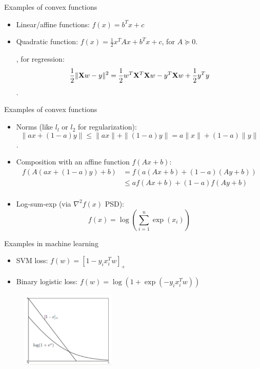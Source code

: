\documentclass[notes]{beamer}
\begin{document}
\begin{frame}
	{Examples of convex functions}
	\begin{itemize}
		\item Linear/affine functions: $f(x)=b^Tx +c$
		\item Quadratic function: $f(x)=\frac{1}{2}x^TAx+b^Tx+c $, for $A\succeq 0$.

		      \eg, for regression:  \[\frac{1}{2}\|\mathbf{X} w-y\|^2 = \frac{1}{2} w^{T} \mathbf{X} ^T \mathbf{X} w -y^T \mathbf{X} w + \frac{1}{2} y^T y \].

	\end{itemize}
\end{frame}
\begin{frame}
	{Examples of convex functions}
	\begin{itemize}

		\item Norms (like $l_l$ or $l_2$ for regularization):
		      \[ \|ax+(1-a)y\|\le \|ax\| +\|(1-a)y\| = a\|x\| +  (1-a) \|y\| \].
		\item Composition with an affine function $f(Ax+b)$:
		      \begin{equation*}
			      \begin{aligned}
				      f\left(A(ax+(1-a)y)+b\right) & = f( a(Ax+b) + (1-a) (Ay+b)) \\
				                                   & \le af(Ax+b) + (1-a) f(Ay+b) \\
			      \end{aligned}
		      \end{equation*}
		\item Log-sum-exp (via $\nabla^2 f(x)$ PSD): $$f(x)=\log \left(\sum_{i=1}^{n} \exp(x_i) \right)$$
	\end{itemize}
\end{frame}

\begin{frame}
	{Examples in machine learning}
	\begin{itemize}
		\item SVM loss: $f(w) = [1-y_i x_i^T w]_+ $
		\item Binary logistic loss: $f(w)=\log ( 1+ \exp ( -y_i  x_i ^T w ))$
	\end{itemize}
	\begin{figure}
		\includegraphics[width=0.4\textwidth]{2018-03-05-11-53-58.png}
	\end{figure}

\end{frame}
\end{document}
